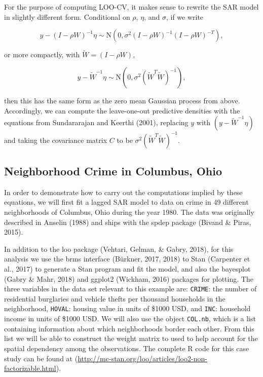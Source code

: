 \documentclass[english,,doc,floatsintext]{apa6}
\theoremstyle{definition}
\theoremstyle{definition}
\theoremstyle{definition}
\theoremstyle{remark}
\begin{document}
For the purpose of computing LOO-CV, it makes sense to rewrite the SAR
model in slightly different form. Conditional on \(\rho\), \(\eta\), and
\(\sigma\), if we write

\begin{equation}
y-(I-\rho W)^{-1}\eta \sim {\mathrm N}(0, \sigma^2(I-\rho W)^{-1}(I-\rho W)^{-T}),
\end{equation}

or more compactly, with \(\widetilde{W}=(I-\rho W)\),

\begin{equation}
y-\widetilde{W}^{-1}\eta \sim {\mathrm N}(0, \sigma^2(\widetilde{W}^{T}\widetilde{W})^{-1}),
\end{equation}

then this has the same form as the zero mean Gaussian process from
above. Accordingly, we can compute the leave-one-out predictive
densities with the equations from Sundararajan and Keerthi (2001),
replacing \(y\) with \((y-\widetilde{W}^{-1}\eta)\) and taking the
covariance matrix \(C\) to be
\(\sigma^2(\widetilde{W}^{T}\widetilde{W})^{-1}\).

\hypertarget{neighborhood-crime-in-columbus-ohio}{%
\subsection{Neighborhood Crime in Columbus,
Ohio}\label{neighborhood-crime-in-columbus-ohio}}

In order to demonstrate how to carry out the computations implied by
these equations, we will first fit a lagged SAR model to data on crime
in 49 different neighborhoods of Columbus, Ohio during the year 1980.
The data was originally described in Anselin (1988) and ships with the
spdep package (Bivand \& Piras, 2015).

In addition to the loo package (Vehtari, Gelman, \& Gabry, 2018), for
this analysis we use the brms interface (Bürkner, 2017, 2018) to Stan
(Carpenter et al., 2017) to generate a Stan program and fit the model,
and also the bayesplot (Gabry \& Mahr, 2018) and ggplot2 (Wickham, 2016)
packages for plotting. The three variables in the data set relevant to
this example are: \texttt{CRIME}: the number of residential burglaries
and vehicle thefts per thousand households in the neighborhood,
\texttt{HOVAL}: housing value in units of \$1000 USD, and \texttt{INC}:
household income in units of \$1000 USD. We will also use the object
\texttt{COL.nb}, which is a list containing information about which
neighborhoods border each other. From this list we will be able to
construct the weight matrix to used to help account for the spatial
dependency among the observations. The complete R code for this case
study can be found at
(\url{http://mc-stan.org/loo/articles/loo2-non-factorizable.html}).
\end{document}
